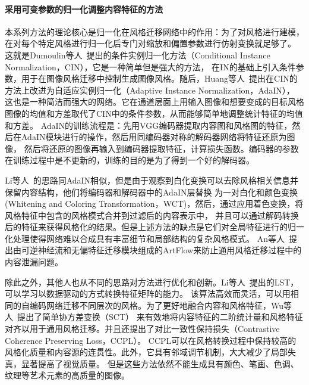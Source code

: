 \paragraph{采用可变参数的归一化调整内容特征的方法}
本系列方法的理论核心是归一化在风格迁移网络中的作用：为了对风格进行建模，在对每个特定风格进行归一化后专门对缩放和偏置参数进行仿射变换就足够了。
这就是Dumoulin等人~\cite{dumoulin2016learned,ghiasi2017exploring}提出的条件实例归一化方法（Conditional Instance Normalization，CIN），它是一种简单但是强大的方法，
在IN的基础上引入条件参数，用于在图像风格迁移中控制生成图像风格。随后，Huang等人~\cite{huang2017arbitrary}提出在CIN的方法上改进为自适应实例归一化（Adaptive Instance Normalization，AdaIN），
这也是一种简洁而强大的网络。它在通道层面上用输入图像和想要变成的目标风格图像的均值和方差取代了CIN中的条件参数，从而能够简单地调整统计特征的均值和方差。
AdaIN的训练流程是：先用VGG编码器提取内容图和风格图的特征，然后在AdaIN模块进行的操作，然后用同编码器对称的解码器网络将特征还原为图像，
然后将还原的图像再输入到编码器提取特征，计算损失函数。编码器的参数在训练过程中是不更新的，训练的目的是为了得到一个好的解码器。
\par Li等人~\cite{li2017universal}的思路同AdaIN相似，但是由于观察到白化变换可以去除风格相关信息并保留内容结构，他们将编码器和解码器中的AdaIN层替换
为一对白化和颜色变换(Whitening and Coloring Transformation，WCT)，然后，通过应用着色变换，将风格特征中包含的风格模式合并到过滤后的内容表示中，
并且可以通过解码转换后的特征来获得风格化的结果。但是上述方法的缺点是它们对全局特征进行的归一化处理使得网络难以合成具有丰富细节和局部结构的复杂风格模式。
An等人~\cite{an2021artflow}提出由可逆神经流和无偏特征迁移模块组成的ArtFlow来防止通用风格迁移过程中的内容泄漏问题。
\par 除此之外，其他人也从不同的思路对方法进行优化和创新。Li等人~\cite{li2019learning}提出的LST，可以学习以数据驱动的方式转换特征矩阵的能力。
该算法高效而灵活，可以用相同的自编码网络迁移不同层次的风格。为了更好地融合内容和风格特征，Wu等人~\cite{wu2022ccpl}提出了简单协方差变换（SCT）
来有效地将内容特征的二阶统计量和风格特征对齐以用于通用风格迁移。并且还提出了对比一致性保持损失（Contrastive Coherence Preserving Loss，CCPL）。
CCPL可以在风格转换过程中保持较高的风格化质量和内容源的连贯性。此外，它具有邻域调节机制，大大减少了局部失真，显著提高了视觉质量。
但是这些方法依然不能生成具有颜色、笔画、色调、纹理等艺术元素的高质量的图像。

